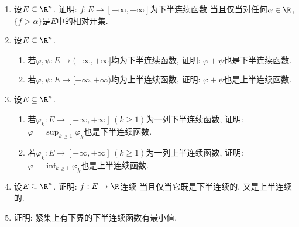 \begin{quiza}
\begin{enumerate}
\item 设\(E\subseteq\R^n\). 证明: \(f:E\rightarrow[-\infty,+\infty]\)为下半连续函数
当且仅当对任何\(\alpha\in\R\), \(\{f>\alpha\}\)是\(E\)中的相对开集.

\item 设\(E\subseteq\R^n\).\begin{enumerate}[label=(\arabic*)]
\item 若\(\varphi,\psi:E\rightarrow(-\infty,+\infty]\)均为下半连续函数, 
证明: \(\varphi+\psi\)也是下半连续函数.
\item 若\(\varphi,\psi:E\rightarrow[-\infty,+\infty)\)均为上半连续函数, 
证明: \(\varphi+\psi\)也是上半连续函数.
\end{enumerate}

\item 设\(E\subseteq\R^n\).\begin{enumerate}[label=(\arabic*)]
\item 若\(\varphi_k:E\rightarrow[-\infty,+\infty]\,(k\geqslant 1)\)为一列下半连续函数, 证明: \(\varphi=\sup_{k\geqslant 1}\varphi_k\)也是下半连续函数.
\item 若\(\varphi_k:E\rightarrow[-\infty,+\infty]\,(k\geqslant 1)\)为一列上半连续函数, 证明: \(\varphi=\inf_{k\geqslant 1}\varphi_k\)也是上半连续函数.
\end{enumerate}

\item 设\(E\subseteq\R^n\). 证明: \(f:E\rightarrow\R\)连续
当且仅当它既是下半连续的, 又是上半连续的.

\item 证明: 紧集上有下界的下半连续函数有最小值.
\end{enumerate}
\end{quiza}

